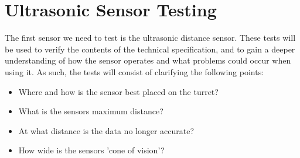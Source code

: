 \section{Ultrasonic Sensor Testing}\label{SensorTest}
The first sensor we need to test is the ultrasonic distance sensor. These tests
will be used to verify the contents of the technical specification, and
to gain a deeper understanding of how the sensor operates and what
problems could occur when using it. As such, the tests will consist of
clarifying the following points:
\begin{itemize}
  \item Where and how is the sensor best placed on the turret?
  \item What is the sensors maximum distance?
  \item At what distance is the data no longer accurate?
  \item How wide is the sensors 'cone of vision'? 
\end{itemize}

% 

% 
 

